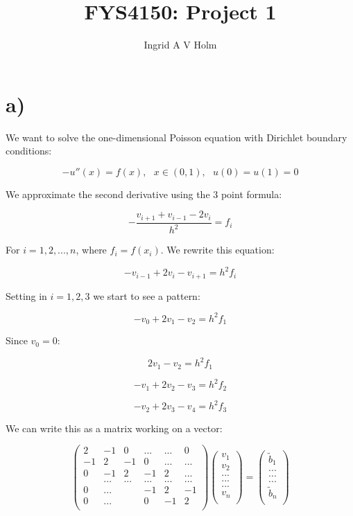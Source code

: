 \documentclass[11pt]{article}
\begin{document}
\title{FYS4150: Project 1}
\author{Ingrid A V Holm}
\maketitle

\section*{a)}
\begin{flushleft}

We want to solve the one-dimensional Poisson equation with Dirichlet boundary conditions:

\begin{equation}
-u''(x) = f(x), \textbf{ } x \in (0,1), \textbf{ } u(0) = u(1) = 0
\end{equation}

We approximate the second derivative using the 3 point formula:

\begin{equation}
- \frac{v_{i+1} + v_{i-1} - 2 v_i}{h^2} = f_i 
\end{equation}

For $i = 1,2,...,n$, where $f_i = f(x_i)$. We rewrite this equation:

$$
- v_{i-1} + 2 v_i - v_{i+1}= h^2 f_i 
$$

Setting in $i = 1,2,3$ we start to see a pattern:

$$
- v_0 + 2 v_1 - v_2= h^2 f_1 
$$

Since $v_0 = 0$:

$$
2 v_1 - v_2= h^2 f_1 
$$

$$
- v_1 + 2 v_2 - v_3= h^2 f_2 
$$

$$
- v_2 + 2 v_3 - v_4= h^2 f_3 
$$

We can write this as a matrix working on a vector:

$$
\begin{pmatrix}
2 & -1 & 0 &...& ... & 0\\
-1 & 2 & -1 & 0 & ... & ...\\
0 & -1 & 2 & -1 & 2 & ...\\
& ... & ... & ... & ... & ...\\
0 & ... & & -1 & 2 & -1\\
0 & ... & & 0 & -1 & 2\\
\end{pmatrix}
\begin{pmatrix}
v_1\\
v_2\\
...\\
...\\
...\\
v_n\\
\end{pmatrix}
=
\begin{pmatrix}
\tilde{b}_1\\
...\\
...\\
...\\
\tilde{b}_n\\
\end{pmatrix}
$$


\end{flushleft}
\end{document}
